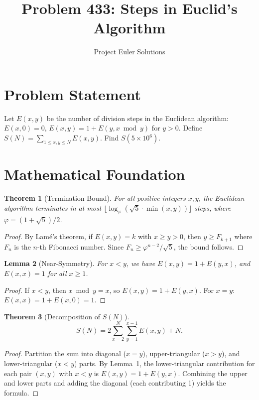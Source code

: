 \documentclass[11pt]{article}
\title{Problem 433: Steps in Euclid's Algorithm}
\author{Project Euler Solutions}
\date{}
\newtheorem{theorem}{Theorem}
\newtheorem{lemma}[theorem]{Lemma}
\begin{document}
\maketitle

\section{Problem Statement}
Let $E(x, y)$ be the number of division steps in the Euclidean algorithm: $E(x, 0) = 0$, $E(x, y) = 1 + E(y, x \bmod y)$ for $y > 0$. Define $S(N) = \sum_{1 \leq x, y \leq N} E(x, y)$. Find $S(5 \times 10^6)$.

\section{Mathematical Foundation}

\begin{theorem}[Termination Bound]
For all positive integers $x, y$, the Euclidean algorithm terminates in at most $\lfloor \log_\varphi(\sqrt{5}\cdot\min(x,y)) \rfloor$ steps, where $\varphi = (1+\sqrt{5})/2$.
\end{theorem}

\begin{proof}
By Lam\'e's theorem, if $E(x,y) = k$ with $x \geq y > 0$, then $y \geq F_{k+1}$ where $F_n$ is the $n$-th Fibonacci number. Since $F_n \geq \varphi^{n-2}/\sqrt{5}$, the bound follows.
\end{proof}

\begin{lemma}[Near-Symmetry]
For $x < y$, we have $E(x, y) = 1 + E(y, x)$, and $E(x, x) = 1$ for all $x \geq 1$.
\end{lemma}

\begin{proof}
If $x < y$, then $x \bmod y = x$, so $E(x, y) = 1 + E(y, x)$. For $x = y$: $E(x, x) = 1 + E(x, 0) = 1$.
\end{proof}

\begin{theorem}[Decomposition of $S(N)$]
\[
S(N) = 2\sum_{x=2}^{N}\sum_{y=1}^{x-1} E(x, y) + N.
\]
\end{theorem}

\begin{proof}
Partition the sum into diagonal ($x = y$), upper-triangular ($x > y$), and lower-triangular ($x < y$) parts. By Lemma~1, the lower-triangular contribution for each pair $(x, y)$ with $x < y$ is $E(x, y) = 1 + E(y, x)$. Combining the upper and lower parts and adding the diagonal (each contributing 1) yields the formula.
\end{proof}
\end{document}
